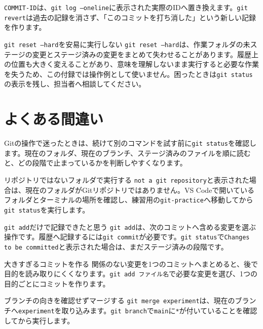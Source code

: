 \texttt{COMMIT-ID}は、\texttt{git log --oneline}に表示された実際のIDへ置き換えます。\texttt{git revert}は過去の記録を消さず、「このコミットを打ち消した」という新しい記録を作ります。

\begin{notebox}{\texttt{git reset --hard}を安易に実行しない}
\texttt{git reset --hard}は、作業フォルダの未ステージの変更とステージ済みの変更をまとめて失わせることがあります。履歴上の位置も大きく変えることがあり、意味を理解しないまま実行すると必要な作業を失うため、この付録では操作例として使いません。困ったときは\texttt{git status}の表示を残し、担当者へ相談してください。
\end{notebox}

\section{よくある間違い}

Gitの操作で迷ったときは、続けて別のコマンドを試す前に\texttt{git status}を確認します。現在のフォルダ、現在のブランチ、ステージ済みのファイルを順に読むと、どの段階で止まっているかを判断しやすくなります。

\begin{mistakebox}{リポジトリではないフォルダで実行する}
\texttt{not a git repository}と表示された場合は、現在のフォルダがGitリポジトリではありません。VS Codeで開いているフォルダとターミナルの場所を確認し、練習用の\texttt{git-practice}へ移動してから\texttt{git status}を実行します。
\end{mistakebox}

\begin{mistakebox}{\texttt{git add}だけで記録できたと思う}
\texttt{git add}は、次のコミットへ含める変更を選ぶ操作です。履歴へ記録するには\texttt{git commit}が必要です。\texttt{git status}で\texttt{Changes to be committed}と表示された場合は、まだステージ済みの段階です。
\end{mistakebox}

\begin{mistakebox}{大きすぎるコミットを作る}
関係のない変更を1つのコミットへまとめると、後で目的を読み取りにくくなります。\texttt{git add ファイル名}で必要な変更を選び、1つの目的ごとにコミットを作ります。
\end{mistakebox}

\begin{mistakebox}{ブランチの向きを確認せずマージする}
\texttt{git merge experiment}は、現在のブランチへ\texttt{experiment}を取り込みます。\texttt{git branch}で\texttt{main}に\texttt{*}が付いていることを確認してから実行します。
\end{mistakebox}

